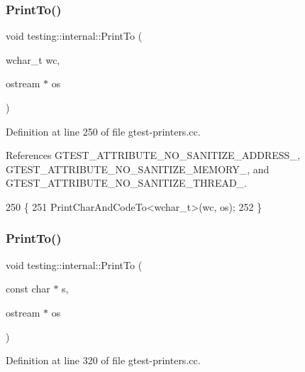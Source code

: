 \subsubsection{\texorpdfstring{Print\+To()}{PrintTo()}\hspace{0.1cm}{\footnotesize\ttfamily [1/20]}}
{\footnotesize\ttfamily void testing\+::internal\+::\+Print\+To (\begin{DoxyParamCaption}\item[{wchar\+\_\+t}]{wc,  }\item[{ostream $\ast$}]{os }\end{DoxyParamCaption})}



Definition at line 250 of file gtest-\/printers.\+cc.



References G\+T\+E\+S\+T\+\_\+\+A\+T\+T\+R\+I\+B\+U\+T\+E\+\_\+\+N\+O\+\_\+\+S\+A\+N\+I\+T\+I\+Z\+E\+\_\+\+A\+D\+D\+R\+E\+S\+S\+\_\+, G\+T\+E\+S\+T\+\_\+\+A\+T\+T\+R\+I\+B\+U\+T\+E\+\_\+\+N\+O\+\_\+\+S\+A\+N\+I\+T\+I\+Z\+E\+\_\+\+M\+E\+M\+O\+R\+Y\+\_\+, and G\+T\+E\+S\+T\+\_\+\+A\+T\+T\+R\+I\+B\+U\+T\+E\+\_\+\+N\+O\+\_\+\+S\+A\+N\+I\+T\+I\+Z\+E\+\_\+\+T\+H\+R\+E\+A\+D\+\_\+.


\begin{DoxyCode}
250                                       \{
251   PrintCharAndCodeTo<wchar\_t>(wc, os);
252 \}
\end{DoxyCode}
\mbox{\label{namespacetesting_1_1internal_adc6c98306d40b53fd07be4e295102a0a}} 
\subsubsection{\texorpdfstring{Print\+To()}{PrintTo()}\hspace{0.1cm}{\footnotesize\ttfamily [2/20]}}
{\footnotesize\ttfamily void testing\+::internal\+::\+Print\+To (\begin{DoxyParamCaption}\item[{const char $\ast$}]{s,  }\item[{ostream $\ast$}]{os }\end{DoxyParamCaption})}



Definition at line 320 of file gtest-\/printers.\+cc.



